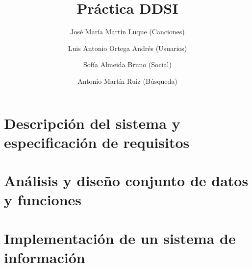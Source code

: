 \documentclass[
  12pt,
  a4paper,
  DIV=12,
  spanish,
]{scrartcl}
\title{Práctica DDSI}
\author{José María Martín Luque (Canciones) \and Luis Antonio Ortega Andrés (Usuarios) \and Sofía Almeida Bruno (Social) \and Antonio Martín Ruiz (Búsqueda)  }
\begin{document}
\maketitle
{\parskip=2pt
  \tableofcontents
}
\pagebreak

\section{Descripción del sistema y especificación de requisitos}



\section{Análisis y diseño conjunto de datos y funciones}


\section{Implementación de un sistema de información}

\end{document}
